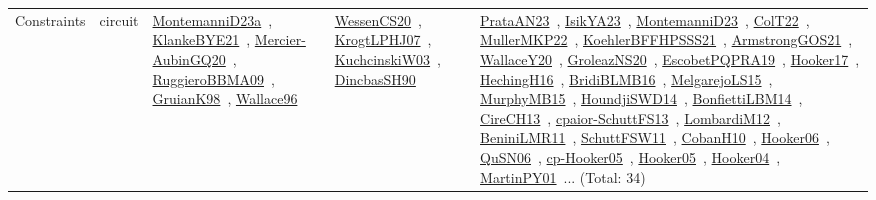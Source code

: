 {\begin{longtable}{lp{3cm}>{\raggedright\arraybackslash}p{6cm}>{\raggedright\arraybackslash}p{6cm}>{\raggedright\arraybackslash}p{8cm}}
Constraints & circuit & \href{articles/MontemanniD23a.pdf}{MontemanniD23a}~\cite{MontemanniD23a}, \href{papers/KlankeBYE21.pdf}{KlankeBYE21}~\cite{KlankeBYE21}, \href{papers/Mercier-AubinGQ20.pdf}{Mercier-AubinGQ20}~\cite{Mercier-AubinGQ20}, \href{articles/RuggieroBBMA09.pdf}{RuggieroBBMA09}~\cite{RuggieroBBMA09}, \href{papers/GruianK98.pdf}{GruianK98}~\cite{GruianK98}, \href{articles/Wallace96.pdf}{Wallace96}~\cite{Wallace96} & \href{papers/WessenCS20.pdf}{WessenCS20}~\cite{WessenCS20}, \href{papers/KrogtLPHJ07.pdf}{KrogtLPHJ07}~\cite{KrogtLPHJ07}, \href{articles/KuchcinskiW03.pdf}{KuchcinskiW03}~\cite{KuchcinskiW03}, \href{articles/DincbasSH90.pdf}{DincbasSH90}~\cite{DincbasSH90} & \href{articles/PrataAN23.pdf}{PrataAN23}~\cite{PrataAN23}, \href{articles/IsikYA23.pdf}{IsikYA23}~\cite{IsikYA23}, \href{articles/MontemanniD23.pdf}{MontemanniD23}~\cite{MontemanniD23}, \href{articles/ColT22.pdf}{ColT22}~\cite{ColT22}, \href{articles/MullerMKP22.pdf}{MullerMKP22}~\cite{MullerMKP22}, \href{articles/KoehlerBFFHPSSS21.pdf}{KoehlerBFFHPSSS21}~\cite{KoehlerBFFHPSSS21}, \href{papers/ArmstrongGOS21.pdf}{ArmstrongGOS21}~\cite{ArmstrongGOS21}, \href{articles/WallaceY20.pdf}{WallaceY20}~\cite{WallaceY20}, \href{papers/GroleazNS20.pdf}{GroleazNS20}~\cite{GroleazNS20}, \href{articles/EscobetPQPRA19.pdf}{EscobetPQPRA19}~\cite{EscobetPQPRA19}, \href{papers/Hooker17.pdf}{Hooker17}~\cite{Hooker17}, \href{papers/HechingH16.pdf}{HechingH16}~\cite{HechingH16}, \href{articles/BridiBLMB16.pdf}{BridiBLMB16}~\cite{BridiBLMB16}, \href{papers/MelgarejoLS15.pdf}{MelgarejoLS15}~\cite{MelgarejoLS15}, \href{papers/MurphyMB15.pdf}{MurphyMB15}~\cite{MurphyMB15}, \href{papers/HoundjiSWD14.pdf}{HoundjiSWD14}~\cite{HoundjiSWD14}, \href{articles/BonfiettiLBM14.pdf}{BonfiettiLBM14}~\cite{BonfiettiLBM14}, \href{papers/CireCH13.pdf}{CireCH13}~\cite{CireCH13}, \href{papers/cpaior-SchuttFS13.pdf}{cpaior-SchuttFS13}~\cite{cpaior-SchuttFS13}, \href{articles/LombardiM12.pdf}{LombardiM12}~\cite{LombardiM12}, \href{articles/BeniniLMR11.pdf}{BeniniLMR11}~\cite{BeniniLMR11}, \href{articles/SchuttFSW11.pdf}{SchuttFSW11}~\cite{SchuttFSW11}, \href{papers/CobanH10.pdf}{CobanH10}~\cite{CobanH10}, \href{articles/Hooker06.pdf}{Hooker06}~\cite{Hooker06}, \href{papers/QuSN06.pdf}{QuSN06}~\cite{QuSN06}, \href{papers/cp-Hooker05.pdf}{cp-Hooker05}~\cite{cp-Hooker05}, \href{articles/Hooker05.pdf}{Hooker05}~\cite{Hooker05}, \href{papers/Hooker04.pdf}{Hooker04}~\cite{Hooker04}, \href{articles/MartinPY01.pdf}{MartinPY01}~\cite{MartinPY01}... (Total: 34)\\

\end{longtable}}
